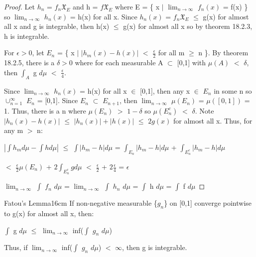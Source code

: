     \begin{proof}
        Let $h_n$ = $f_n \mathfrak{X}_E$ and h = $f \mathfrak{X}_E$
        where E = \{ x $|$ $\lim_{n \rightarrow \infty}$ $f_n(x)$ = f(x) \}
        so $\lim_{n \rightarrow \infty}$ $h_n(x)$ = h(x) for all x.
        Since $h_n(x)$ = $f_n \mathfrak{X}_E$ $\leq$ g(x) for almost all
        x and g is integrable, then h(x) $\leq$ g(x) for almost all x
        so by {\color{red} theorem 18.2.3}, h is integrable.

        For $\epsilon > 0$, let $E_n$ =
        \{ x $|$ $|h_m(x) - h(x)|$ $<$ $\frac{\epsilon}{2}$ for all m $\geq$ n \}.
        By {\color{red} theorem 18.2.5}, there is a $\delta > 0$
        where for each measurable A $\subset$ [0,1] with $\mu(A)$ $<$ $\delta$,
        then $\int_A$ g $d\mu$ $<$ $\frac{\epsilon}{4}$.

        Since $\lim_{n \rightarrow \infty}$ $h_n(x)$ = h(x) for all x $\in$ [0,1],
        then any x $\in$ $E_n$ in some n so $\cup_{n=1}^{\infty}$ $E_n$ = [0,1].
        Since $E_n$ $\subset$ $E_{n+1}$, then
        $\lim_{n \rightarrow \infty}$ $\mu(E_n)$ = $\mu([0,1])$ = 1.
        Thus, there is a n where $\mu(E_n)$ $>$ $1-\delta$
        so $\mu(E_n^c)$ $<$ $\delta$.
        Note $|h_n(x) - h(x)|$ $\leq$ $|h_n(x)| + |h(x)|$ $\leq$ $2g(x)$
        for almost all x. Thus, for any m $>$ n:

        \hspace{0.5cm}
        $|\int h_m d\mu - \int h d\mu|$
        $\leq$ $\int |h_m - h| d\mu$
        = $\int_{E_n} |h_m - h| d\mu$ + $\int_{E_n^c} |h_m - h| d\mu$
        
        \hspace{3.8cm}
        $<$ $\frac{\epsilon}{2} \mu(E_n)$ + $2 \int_{E_n^c} g d\mu$
        $<$ $\frac{\epsilon}{2}$ + $2 \frac{\epsilon}{4}$
        = $\epsilon$

        \hspace{0.5cm}
        $\lim_{n \rightarrow \infty}$ $\int$ $f_n$ $d\mu$
        = $\lim_{n \rightarrow \infty}$ $\int$ $h_n$ $d\mu$
        = $\int$ h $d\mu$
        = $\int$ f $d\mu$
    \end{proof}

    \newpage



    \begin{wtheorem}{Fatou's Lemma}{16cm}
        If non-negative measurable \{$g_n$\} on [0,1]
        converge pointwise to g(x) for almost all x, then:

        \hspace{0.5cm}
        $\int$ g $d\mu$
        $\leq$ $\lim_{n \rightarrow \infty}$ inf($\int$ $g_n$ $d\mu$)

        Thus, if $\lim_{n \rightarrow \infty}$ inf($\int$ $g_n$ $d\mu$)
        $<$ $\infty$, then g is integrable.
    \end{wtheorem}


